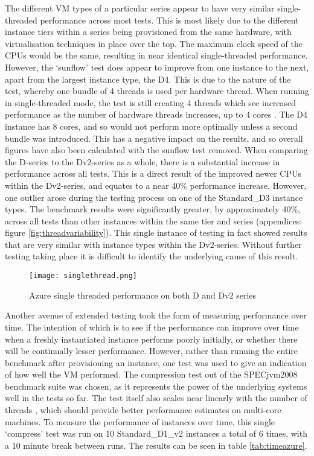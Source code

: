 \documentclass{llncs}
\begin{document}
The different VM types of a particular series appear to have very similar single-threaded performance across most tests. This is most likely due to the different instance tiers within a series being provisioned from the same hardware, with virtualisation techniques in place over the top. The maximum clock speed of the CPUs would be the same, resulting in near identical single-threaded performance. However, the `sunflow' test does appear to improve from one instance to the next, apart from the largest instance type, the D4. This is due to the nature of the test, whereby one bundle of 4 threads is used per hardware thread. When running in single-threaded mode, the test is still creating 4 threads which see increased performance as the number of hardware threads increases, up to 4 cores \cite{shiv2009specjvm2008}. The D4 instance has 8 cores, and so would not perform more optimally unless a second bundle was introduced. This has a negative impact on the results, and so overall figures have also been calculated with the sunflow test removed. When comparing the D-series to the Dv2-series as a whole, there is a substantial increase in performance across all tests. This is a direct result of the improved newer CPUs within the Dv2-series, and equates to a near 40\% performance increase. However, one outlier arose during the testing process on one of the Standard\_D3 instance types. The benchmark results were significantly greater, by approximately 40\%, across all tests than other instances within the same tier and series (appendices: figure \ref{fig:threadvariability}). This single instance of testing in fact showed results that are very similar with instance types within the Dv2-series. Without further testing taking place it is difficult to identify the underlying cause of this result.

\begin{figure}[ht]
  \centering
  \texttt{[image: singlethread.png]}
  \caption{Azure single threaded performance on both D and Dv2 series}
  \label{fig:threadchart}
\end{figure}

Another avenue of extended testing took the form of measuring performance over time. The intention of which is to see if the performance can improve over time when a freshly instantiated instance performs poorly initially, or whether there will be continually lesser performance. However, rather than running the entire benchmark after provisioning an instance, one test was used to give an indication of how well the VM performed. The compression test out of the SPECjvm2008 benchmark suite was chosen, as it represents the power of the underlying systems well in the tests so far. The test itself also scales near linearly with the number of threads \cite{shiv2009specjvm2008}, which should provide better performance estimates on multi-core machines. To measure the performance of instances over time, this single `compress' test was run on 10 Standard\_D1\_v2 instances a total of 6 times, with a 10 minute break between runs. The results can be seen in table \ref{tab:timeazure}.
\end{document}
